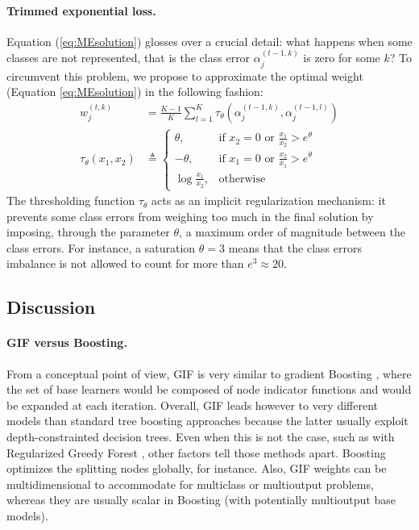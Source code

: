 \documentclass{article}
\begin{document}
\paragraph{Trimmed exponential loss.}
Equation (\ref{eq:MEsolution}) glosses over a crucial detail: what happens when 
some classes are not represented, that is the class error $\alpha_j^{(t-1, k)}$ 
is zero for some $k$? To circumvent this problem, we propose to approximate the 
optimal weight (Equation \ref{eq:MEsolution}) in the following fashion:
\begin{align}\label{eq:METrimmed}
w_j^{(t,k)} &= \frac{K-1}{K} \sum_{l=1}^{K} \tau_{\theta} \left(\alpha_j^{(t-1, 
k)},  \alpha_j^{(t-1, l)}\right)\\
\tau_{\theta}(x_1, x_2) &\triangleq \begin{cases}
    \theta, & \text{if $x_2 = 0$ or $\frac{x_1}{x_2} > e^{\theta}$}\\
    -\theta,& \text{if $x_1 = 0$ or $\frac{x_2}{x_1} > e^{\theta}$}\\
    \log \frac{x_1}{x_2}, & \text{otherwise}
  \end{cases}
\end{align}
The thresholding function $\tau_{\theta}$ acts as an implicit regularization 
mechanism: it prevents some class errors from weighing too much in the final 
solution by imposing, through the parameter $\theta$, a maximum order of magnitude between the class errors. %
For instance, a saturation $\theta=3$ means that the class errors imbalance is 
not allowed to count for more than $e^3 \approx 20$. 

\subsection{Discussion}
\label{subsec:discussparams}

\paragraph{GIF versus Boosting.}
From a conceptual point of view, GIF is very similar to gradient Boosting
\cite{friedman2001gradboost}, where the set of base learners would be composed 
of node indicator functions and would be expanded at each iteration. Overall, 
GIF leads however to very different models than standard tree boosting 
approaches because the latter usually exploit depth-constrainted decision 
trees. Even when this is not the case, such as with Regularized Greedy Forest 
\cite{johnson2014regforest}, other factors tell those methods apart. Boosting 
optimizes the splitting nodes globally, for instance. Also, GIF weights can be 
multidimensional to accommodate for multiclass or multioutput problems, whereas 
they are usually scalar in Boosting (with potentially multioutput base models).
\end{document}
